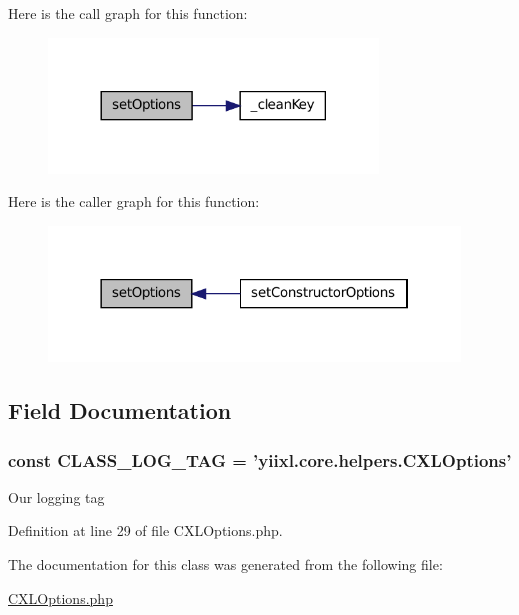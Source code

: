 



Here is the call graph for this function:\nopagebreak
\begin{figure}[H]
\begin{center}
\leavevmode
\includegraphics[width=248pt]{classCXLOptions_ad3b069fcc716a41662fc6256f080438c_cgraph}
\end{center}
\end{figure}




Here is the caller graph for this function:\nopagebreak
\begin{figure}[H]
\begin{center}
\leavevmode
\includegraphics[width=310pt]{classCXLOptions_ad3b069fcc716a41662fc6256f080438c_icgraph}
\end{center}
\end{figure}




\subsection{Field Documentation}
\hypertarget{classCXLOptions_aa607ab5e557e6ebb60b85c5a20ad067f}{
\subsubsection[{CLASS\_\-LOG\_\-TAG}]{\setlength{\rightskip}{0pt plus 5cm}const {\bf CLASS\_\-LOG\_\-TAG} = 'yiixl.core.helpers.CXLOptions'}}
\label{classCXLOptions_aa607ab5e557e6ebb60b85c5a20ad067f}
Our logging tag 

Definition at line 29 of file CXLOptions.php.



The documentation for this class was generated from the following file:\begin{DoxyCompactItemize}
\item 
\hyperlink{CXLOptions_8php}{CXLOptions.php}\end{DoxyCompactItemize}
